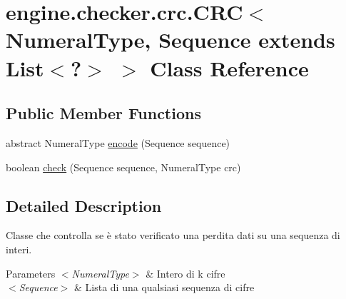 \hypertarget{classengine_1_1checker_1_1crc_1_1_c_r_c_3_01_numeral_type_00_01_sequence_01extends_01_list_3_04_4_01_4}{\section{engine.\-checker.\-crc.\-C\-R\-C$<$ Numeral\-Type, Sequence extends List$<$?$>$ $>$ Class Reference}
\label{classengine_1_1checker_1_1crc_1_1_c_r_c_3_01_numeral_type_00_01_sequence_01extends_01_list_3_04_4_01_4}
}
\subsection*{Public Member Functions}
\begin{DoxyCompactItemize}
\item 
abstract Numeral\-Type \hyperlink{classengine_1_1checker_1_1crc_1_1_c_r_c_3_01_numeral_type_00_01_sequence_01extends_01_list_3_04_4_01_4_a3b8d42e3a0f86195ac310739c17fe8dc}{encode} (Sequence sequence)
\item 
boolean \hyperlink{classengine_1_1checker_1_1crc_1_1_c_r_c_3_01_numeral_type_00_01_sequence_01extends_01_list_3_04_4_01_4_a6e0509990e5c017ce3cb22d907987eaf}{check} (Sequence sequence, Numeral\-Type crc)
\end{DoxyCompactItemize}


\subsection{Detailed Description}
Classe che controlla se è stato verificato una perdita dati su una sequenza di interi.


\begin{DoxyParams}{Parameters}
{\em $<$\-Numeral\-Type$>$} & Intero di k cifre \\
\hline
{\em $<$\-Sequence$>$} & Lista di una qualsiasi sequenza di cifre \\
\hline
\end{DoxyParams}


